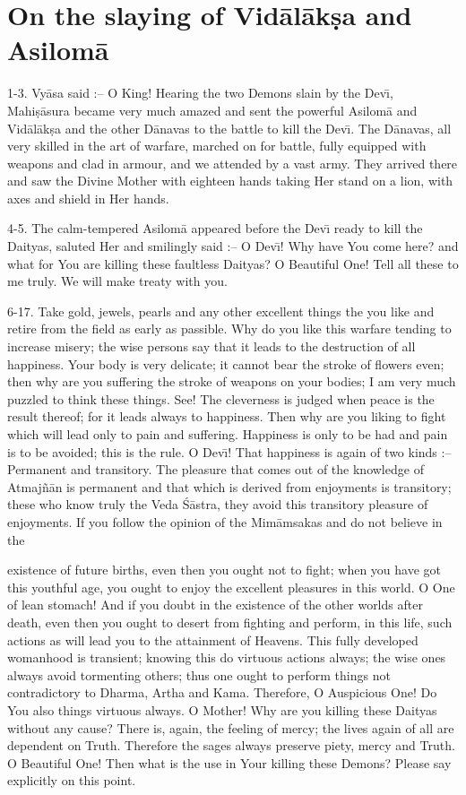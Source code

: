 \chapter{On the slaying of Vid\=al\=ak\d{s}a and Asilom\=a}

1-3. Vy\=asa said :-- O King! Hearing the two Demons slain by the Dev\={\i}, Mahi\d{s}\=asura became very much amazed and sent the powerful Asilom\=a and Vid\=al\=ak\d{s}a and the other D\=anavas to the battle to kill the Dev\={\i}. The D\=anavas, all very skilled in the art of warfare, marched on for battle, fully equipped with weapons and clad in armour, and we attended by a vast army. They arrived there and saw the Divine Mother with eighteen hands taking Her stand on a lion, with axes and shield in Her hands.

4-5. The calm-tempered Asilom\=a appeared before the Dev\={\i} ready to kill the Daityas, saluted Her and smilingly said :-- O Dev\={\i}! Why have You come here? and what for You are killing these faultless Daityas? O Beautiful One! Tell all these to me truly. We will make treaty with you.

6-17. Take gold, jewels, pearls and any other excellent things the you like and retire from the field as early as passible. Why do you like this warfare tending to increase misery; the wise persons say that it leads to the destruction of all happiness. Your body is very delicate; it cannot bear the stroke of flowers even; then why are you suffering the stroke of weapons on your bodies; I am very much puzzled to think these things. See! The cleverness is judged when peace is the result thereof; for it leads always to happiness. Then why are you liking to fight which will lead only to pain and suffering. Happiness is only to be had and pain is to be avoided; this is the rule. O Dev\={\i}! That happiness is again of two kinds :-- Permanent and transitory. The pleasure that comes out of the knowledge of Atmaj\~n\=an is permanent and that which is derived from enjoyments is transitory; these who know truly the Veda \'S\=astra, they avoid this transitory pleasure of enjoyments. If you follow the opinion of the Mim\=amsakas and do not believe in the

existence of future births, even then you ought not to fight; when you have got this youthful age, you ought to enjoy the excellent pleasures in this world. O One of lean stomach! And if you doubt in the existence of the other worlds after death, even then you ought to desert from fighting and perform, in this life, such actions as will lead you to the attainment of Heavens. This fully developed womanhood is transient; knowing this do virtuous actions always; the wise ones always avoid tormenting others; thus one ought to perform things not contradictory to Dharma, Artha and Kama. Therefore, O Auspicious One! Do You also things virtuous always. O Mother! Why are you killing these Daityas without any cause? There is, again, the feeling of mercy; the lives again of all are dependent on Truth. Therefore the sages always preserve piety, mercy and Truth. O Beautiful One! Then what is the use in Your killing these Demons? Please say explicitly on this point.

